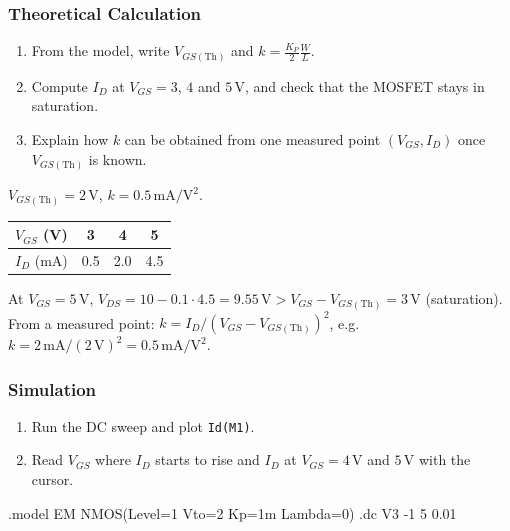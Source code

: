 \subsubsection*{Theoretical Calculation}
\begin{enumerate}[itemsep=2pt]
  \item From the model, write $V_{GS(\mathrm{Th})}$ and $k = \tfrac{K_P}{2}\tfrac{W}{L}$.
  \item Compute $I_D$ at $V_{GS} = 3$, $4$ and $5$\,V, and check that the MOSFET stays in saturation.
  \item Explain how $k$ can be obtained from one measured point $(V_{GS}, I_D)$ once $V_{GS(\mathrm{Th})}$ is known.
\end{enumerate}
\begin{solution}
$V_{GS(\mathrm{Th})} = 2$\,V, $k = 0.5\,\mathrm{mA/V^2}$.
\begin{center}
\begin{tabular}{c c c c}
\toprule
$V_{GS}$ (V) & 3 & 4 & 5\\ \midrule
$I_D$ (mA) & 0.5 & 2.0 & 4.5\\
\bottomrule
\end{tabular}
\end{center}
At $V_{GS} = 5$\,V, $V_{DS} = 10 - 0.1\cdot4.5 = 9.55\,\mathrm{V} > V_{GS}-V_{GS(\mathrm{Th})} = 3$\,V (saturation).
From a measured point: $k = I_D/(V_{GS}-V_{GS(\mathrm{Th})})^2$, e.g.\ $k = 2\,\mathrm{mA}/(2\,\mathrm{V})^2 = 0.5\,\mathrm{mA/V^2}$.
\end{solution}

\subsubsection*{Simulation}
\begin{enumerate}[itemsep=2pt]
  \item Run the DC sweep and plot \texttt{Id(M1)}.
  \item Read $V_{GS}$ where $I_D$ starts to rise and $I_D$ at $V_{GS} = 4$\,V and $5$\,V with the cursor.
\end{enumerate}
\begin{spice}
.model EM NMOS(Level=1 Vto=2 Kp=1m Lambda=0)
.dc V3 -1 5 0.01
\end{spice}

